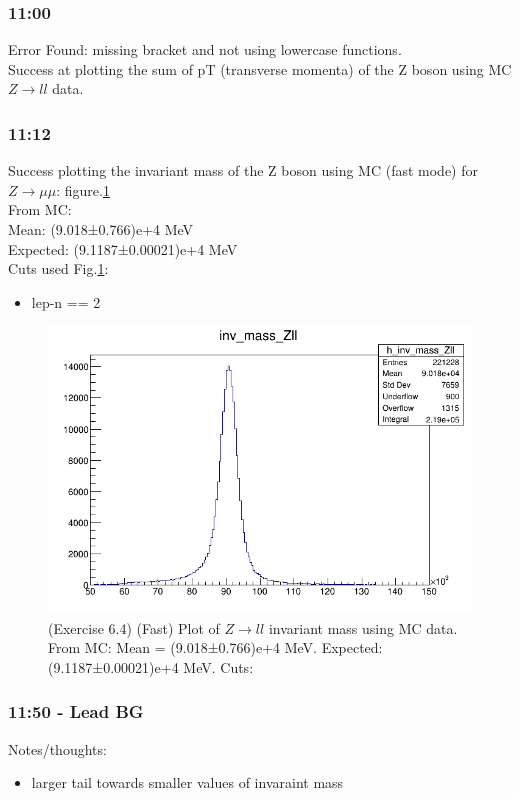 \subsubsection*{\textbf{11:00}}
Error Found:  missing bracket and not using lowercase functions.
\\
Success at plotting the sum of pT (transverse momenta) of the Z boson using MC $Z \rightarrow ll$ data.


\subsubsection*{\textbf{11:12}}
Success plotting the invariant mass of the Z boson using MC (fast mode) for $Z \rightarrow \mu\mu$: figure.\ref{fig:zll_inv-mass_50-150GeV_11-02-21_11:12}
\\
From MC:\\
Mean: (9.018±0.766)e+4 MeV \\
Expected: (9.1187±0.00021)e+4 MeV\\
Cuts used Fig.\ref{fig:zll_inv-mass_50-150GeV_11-02-21_11:12}:
\begin{itemize}
    \item lep-n == 2
\end{itemize}
 
\begin{figure}[h!]
    \centering
	\includegraphics[width=0.85\linewidth]{plots/11-02-2021/Zll-fast_inv-mass_50-150GeV_11-02-21_11:12.png}
	\caption{(Exercise 6.4) (Fast) Plot of $Z \rightarrow ll$ invariant mass using MC data. From MC: Mean = (9.018±0.766)e+4 MeV. Expected: (9.1187±0.00021)e+4 MeV.  Cuts: 
	}
	\label{fig:zll_inv-mass_50-150GeV_11-02-21_11:12}
\end{figure}
 

\subsubsection*{\textbf{11:50} - Lead BG}
Notes/thoughts: 
\begin{itemize}
    \item larger tail towards smaller values of invaraint mass
\end{itemize}

